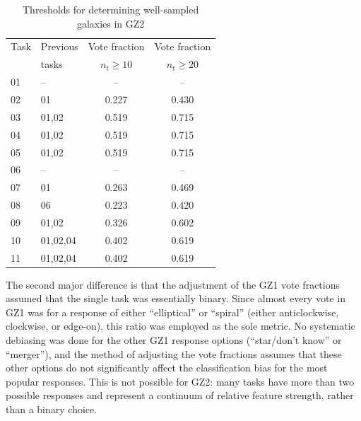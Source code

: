 \documentclass[useAMS,usenatbib]{mn2e}
\begin{document}
\begin{table}
\centering
 \begin{tabular}{@{}llcc}
 \hline
\multicolumn{1}{l}{Task} &
\multicolumn{1}{l}{Previous} &
\multicolumn{1}{c}{Vote fraction} &
\multicolumn{1}{c}{Vote fraction}
\\ 
\multicolumn{1}{l}{} &
\multicolumn{1}{l}{tasks} &
\multicolumn{1}{c}{$n_{t}\geq10$} &
\multicolumn{1}{c}{$n_{t}\geq20$}
\\ 
\hline					
01                      & --        & --        & --        \\
02                      & 01        & 0.227     & 0.430     \\
03                      & 01,02     & 0.519     & 0.715     \\
04                      & 01,02     & 0.519     & 0.715     \\
05                      & 01,02     & 0.519     & 0.715     \\
06                      & --        & --        & --        \\
07                      & 01        & 0.263     & 0.469     \\
08                      & 06        & 0.223     & 0.420     \\
09                      & 01,02     & 0.326     & 0.602     \\
10                      & 01,02,04  & 0.402     & 0.619     \\
11                      & 01,02,04  & 0.402     & 0.619     \\
\hline
 \end{tabular}
 \caption{Thresholds for determining well-sampled galaxies in GZ2 \label{tbl-thresholds}}
\end{table}

The second major difference is that the adjustment of the GZ1 vote fractions assumed that the single task was essentially binary. Since almost every vote in GZ1 was for a response of either ``elliptical'' or ``spiral'' (either anticlockwise, clockwise, or edge-on), this ratio was employed as the sole metric. No systematic debiasing was done for the other GZ1 response options (``star/don't know'' or ``merger''), and the method of adjusting the vote fractions assumes that these other options do not significantly affect the classification bias for the most popular responses. This is not possible for GZ2: many tasks have more than two possible responses and represent a continuum of relative feature strength, rather than a binary choice.
\end{document}
